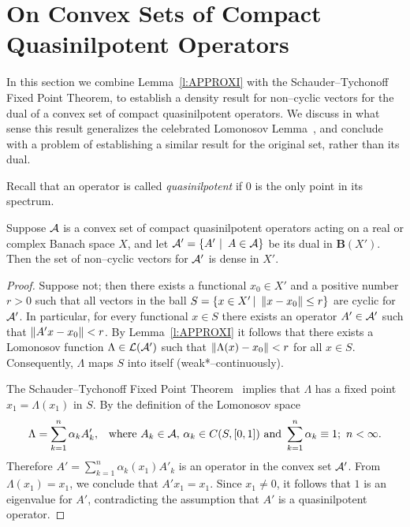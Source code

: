 \goodbreak

\def\baselinestretch{1}

\section{On Convex Sets of Compact Quasinilpotent Operators}

In this section we combine Lemma~\ref{l:APPROXI} with the
Schauder--Tychonoff Fixed Point Theorem, to establish a density
result for non--cyclic vectors for the dual of a convex set of
compact quasinilpotent operators. We discuss in what sense this
result generalizes the celebrated Lomonosov Lemma~\cite{Lom73},
and conclude with a problem of establishing a similar result
for the original set, rather than its dual.

\def\baselinestretch{1.66}
\smallskip

Recall that an operator is called {\em quasinilpotent} if $0$
is the only point in its spectrum.

\begin{thm}\label{t:QC}
Suppose ${\cal A}$ is a convex set of compact quasinilpotent
operators acting on a real or complex Banach space $X$, and let
${\cal A}'=\left\{A'\,\,|\,\,\,A\in{\cal A}\right\}$ be its dual in
$\mathbf{B}(X')$. Then the set of non--cyclic vectors for ${\cal A}'$
is dense in $X'$.
\end{thm}

\begin{proof}
Suppose not; then there exists a functional $x_0\in{X'}$ and a
positive number $r > 0$ such that all vectors in the ball $S =
\left\{x \in X'\,|\,\, \left\Vert x-x_0\right\Vert \leq r\right\}$ are cyclic for
${\cal A}'$. In particular, for every functional $x \in S$ there
exists an operator $A' \in {\cal A}'$ such that $\left\Vert A'x - x_0\right\Vert <
r$. By Lemma~\ref{l:APPROXI} it follows that there exists a
Lomonosov function $\Lambda\in\cal{L}({\cal A}')$ such that
$\left\Vert\Lambda(x)-x_0\right\Vert<r$ for all $x\in{}S$. Consequently,
$\Lambda$ maps $S$ into itself (weak*--continuously).

The Schauder--Tychonoff Fixed Point
Theorem~\cite[p.\,456]{DS57} implies that $\Lambda$ has a fixed
point $x_1=\Lambda(x_1)$ in $S$. By the definition of the
Lomonosov space
\[ \Lambda = \sum_{k=1}^n \alpha_k A'_k,
   \,\,\, \text{ where } A_k\in{\cal A}, \,
   \alpha_k\in C(S,[0,1]) \text{ and } \sum_{k=1}^n\alpha_k \equiv 1;
   \,\, n < \infty . \]
Therefore $A'=\sum_{k=1}^n \alpha_k(x_1) A'_k$ is an operator
in the convex set ${\cal A}'$. From $\Lambda(x_1)=x_1$, we conclude
that $A'x_1=x_1$. Since $x_1\neq0$, it follows that $1$ is an
eigenvalue for $A'$, contradicting the assumption that $A'$ is
a quasinilpotent operator.
\end{proof}

